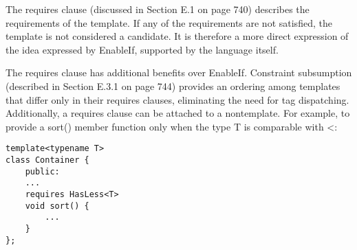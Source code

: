 The requires clause (discussed in Section E.1 on page 740) describes the requirements of the template. If any of the requirements are not satisfied, the template is not considered a candidate. It is therefore a more direct expression of the idea expressed by EnableIf, supported by the language itself.

The requires clause has additional benefits over EnableIf. Constraint subsumption (described in Section E.3.1 on page 744) provides an ordering among templates that differ only in their requires clauses, eliminating the need for tag dispatching. Additionally, a requires clause can be attached to a nontemplate. For example, to provide a sort() member function only when the type T is comparable with <:

\begin{lstlisting}[style=styleCXX]
template<typename T>
class Container {
	public:
	...
	requires HasLess<T>
	void sort() {
		...
	}
};
\end{lstlisting}





